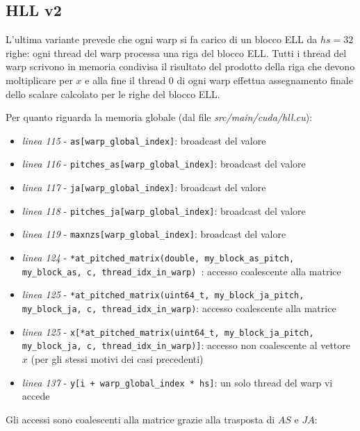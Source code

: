 \documentclass[a4paper,9pt]{extarticle}
\begin{document}
\subsection{HLL v2}
L'ultima variante prevede che ogni warp si fa carico di un blocco ELL da $hs=32$ righe: ogni thread del warp processa
una riga del blocco ELL. Tutti i thread del warp scrivono in memoria condivisa il risultato del prodotto della riga che
devono moltiplicare per $x$
e alla fine il thread 0 di ogni warp effettua assegnamento finale dello scalare calcolato per 
le righe del blocco ELL.

Per quanto riguarda la memoria globale (dal file \textit{src/main/cuda/hll.cu}):
\begin{itemize}
	\item \textit{linea 115} - \texttt{as[warp\_global\_index]}: broadcast del valore
	\item \textit{linea 116} - \texttt{pitches\_as[warp\_global\_index]}: broadcast del valore
	\item \textit{linea 117} - \texttt{ja[warp\_global\_index]}: broadcast del valore
	\item \textit{linea 118} - \texttt{pitches\_ja[warp\_global\_index]}: broadcast del valore
	\item \textit{linea 119} - \texttt{maxnzs[warp\_global\_index]}: broadcast del valore
	\item \textit{linea 124} - \texttt{*at\_pitched\_matrix(double, my\_block\_as\_pitch, \\ my\_block\_as, c, thread\_idx\_in\_warp) }: accesso
	coalescente alla matrice
	\item \textit{linea 125} - \texttt{*at\_pitched\_matrix(uint64\_t, my\_block\_ja\_pitch, \\ my\_block\_ja, c, thread\_idx\_in\_warp)}: accesso
	coalescente alla matrice
	\item \textit{linea 125} - \texttt{x[*at\_pitched\_matrix(uint64\_t, my\_block\_ja\_pitch, \\ my\_block\_ja, c, thread\_idx\_in\_warp)]}:
	accesso non coalescente al vettore $x$ (per gli stessi motivi dei casi precedenti)
	\item \textit{linea 137} - \texttt{y[i + warp\_global\_index * hs]}: un solo thread del warp vi accede
\end{itemize}

Gli accessi sono coalescenti alla matrice grazie alla trasposta di $AS$ e $JA$:
\vspace{\baselineskip}
\end{document}
